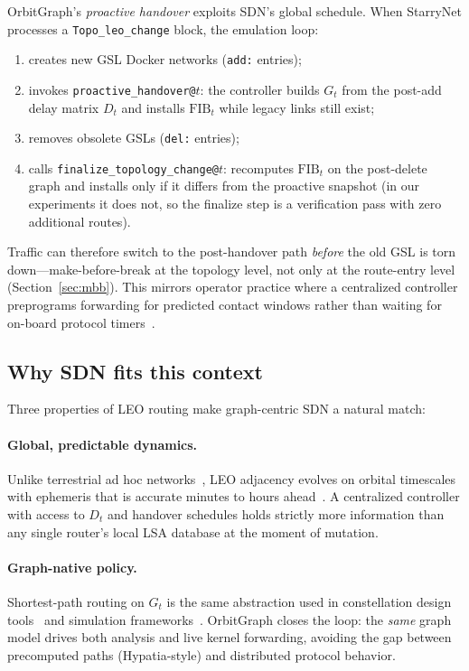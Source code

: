OrbitGraph's \emph{proactive handover} exploits SDN's global schedule.
When StarryNet processes a \texttt{Topo\_leo\_change} block, the emulation loop:
\begin{enumerate}
  \item creates new GSL Docker networks (\texttt{add:} entries);
  \item invokes \texttt{proactive\_handover@$t$}: the controller builds
        $G_t$ from the post-add delay matrix $D_t$ and installs
        $\mathrm{FIB}_t$ while legacy links still exist;
  \item removes obsolete GSLs (\texttt{del:} entries);
  \item calls \texttt{finalize\_topology\_change@$t$}: recomputes
        $\mathrm{FIB}_t$ on the post-delete graph and installs only if it
        differs from the proactive snapshot (in our experiments it does not,
        so the finalize step is a verification pass with zero additional
        routes).
\end{enumerate}
Traffic can therefore switch to the post-handover path \emph{before} the old
GSL is torn down---make-before-break at the topology level, not only at the
route-entry level (Section~\ref{sec:mbb}).
This mirrors operator practice where a centralized controller preprograms
forwarding for predicted contact windows rather than waiting for on-board
protocol timers~\cite{lai2023starrynet,gregory:satellite-routing:2022}.

\subsection{Why SDN fits this context}

Three properties of LEO routing make graph-centric SDN a natural match:

\paragraph{Global, predictable dynamics.}
Unlike terrestrial ad hoc networks~\cite{karp:gpsr:2000,perkins:aodv:1999},
LEO adjacency evolves on orbital timescales with ephemeris that is accurate
minutes to hours ahead~\cite{kassing2020exploring,lai2023starrynet}.
A centralized controller with access to $D_t$ and handover schedules holds
strictly more information than any single router's local LSA database at the
moment of mutation.

\paragraph{Graph-native policy.}
Shortest-path routing on $G_t$ is the same abstraction used in constellation
design tools~\cite{lai2020starperf,handley:ground-relays:2019} and simulation
frameworks~\cite{kempton2020silleo}.
OrbitGraph closes the loop: the \emph{same} graph model drives both analysis
and live kernel forwarding, avoiding the gap between precomputed paths
(Hypatia-style) and distributed protocol behavior.

